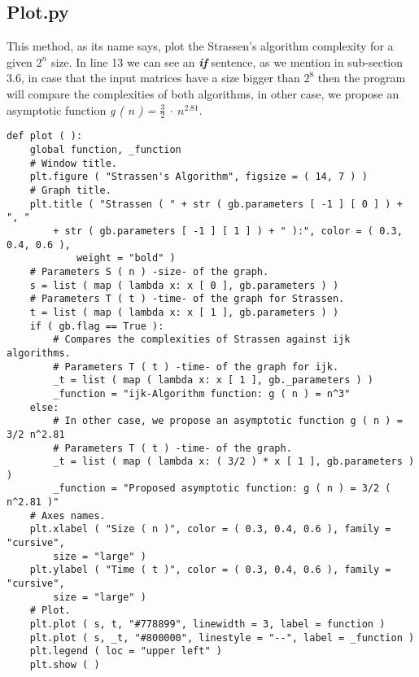 \subsection{Plot.py}

This method, as its name says, plot the Strassen's algorithm complexity for a given $2^{n}$ size. In line 13 we can see an {\bfseries\itshape if} sentence, as we mention in sub-section 3.6, in case that the input matrices have a size bigger than $2^{8}$ then the program will compare the complexities of both algorithms, in other case, we propose an asymptotic function {\itshape g ( n ) = $\frac{3}{2}\ \cdot\ n^{2.81}$}. \hfill \break

\begin{lstlisting}
def plot ( ):
    global function, _function
    # Window title.
    plt.figure ( "Strassen's Algorithm", figsize = ( 14, 7 ) )
    # Graph title.
    plt.title ( "Strassen ( " + str ( gb.parameters [ -1 ] [ 0 ] ) + ", " 
    	+ str ( gb.parameters [ -1 ] [ 1 ] ) + " ):", color = ( 0.3, 0.4, 0.6 ), 
    		weight = "bold" )
    # Parameters S ( n ) -size- of the graph.
    s = list ( map ( lambda x: x [ 0 ], gb.parameters ) )
    # Parameters T ( t ) -time- of the graph for Strassen.
    t = list ( map ( lambda x: x [ 1 ], gb.parameters ) )
    if ( gb.flag == True ):
        # Compares the complexities of Strassen against ijk algorithms.
        # Parameters T ( t ) -time- of the graph for ijk.
        _t = list ( map ( lambda x: x [ 1 ], gb._parameters ) )
        _function = "ijk-Algorithm function: g ( n ) = n^3"
    else:
        # In other case, we propose an asymptotic function g ( n ) = 3/2 n^2.81
        # Parameters T ( t ) -time- of the graph.
        _t = list ( map ( lambda x: ( 3/2 ) * x [ 1 ], gb.parameters ) )
        _function = "Proposed asymptotic function: g ( n ) = 3/2 ( n^2.81 )"
    # Axes names.
    plt.xlabel ( "Size ( n )", color = ( 0.3, 0.4, 0.6 ), family = "cursive", 
    	size = "large" )
    plt.ylabel ( "Time ( t )", color = ( 0.3, 0.4, 0.6 ), family = "cursive", 
    	size = "large" )
    # Plot.
    plt.plot ( s, t, "#778899", linewidth = 3, label = function )
    plt.plot ( s, _t, "#800000", linestyle = "--", label = _function )
    plt.legend ( loc = "upper left" )
    plt.show ( )
\end{lstlisting}

\pagebreak
